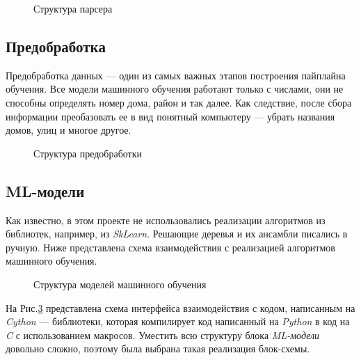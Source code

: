 \documentclass{article}
\begin{document}
			\begin{figure}[H]
				\centering
				\caption{Структура парсера}
				\label{fig:parser}
			\end{figure}
		
		\newpage
		\subsection{Предобработка}
		
			Предобработка данных --- один из самых важных этапов построения пайплайна обучения. Все модели машинного обучения работают только с числами, они не способны определять номер дома, район и так далее. Как следствие, после сбора информации преобазовать ее в вид понятный компьютеру --- убрать названия домов, улиц и многое другое.	
			
			\begin{figure}[H]
				\centering
				\caption{Структура предобработки}
				\label{fig:preprocessing}
			\end{figure}
			
	
	
		\newpage
		\subsection{ML-модели}
			
			Как известно, в этом проекте не использовались реализации алгоритмов из библиотек, например, из \textit{SkLearn}. Решающие деревья и их ансамбли писались в ручную. Ниже представлена схема взаимодействия с реализацией алгоритмов машинного обучения.
			
			\begin{figure}[H]
				\centering
				\caption{Структура моделей машинного обучения}
				\label{fig:ml_model}
			\end{figure}
		
			На Рис.\ref{fig:ml_model} представлена схема интерфейса взаимодействия с кодом, написанным на \textit{Cython} \cite{litlink10} --- библиотеки, которая компилирует код написанный на \textit{Python} в код на \textit{C} с использованием макросов. Уместить всю структуру блока \textit{ML-модели} довольно сложно, поэтому была выбрана такая реализация блок-схемы.
			
		\newpage
\end{document}
